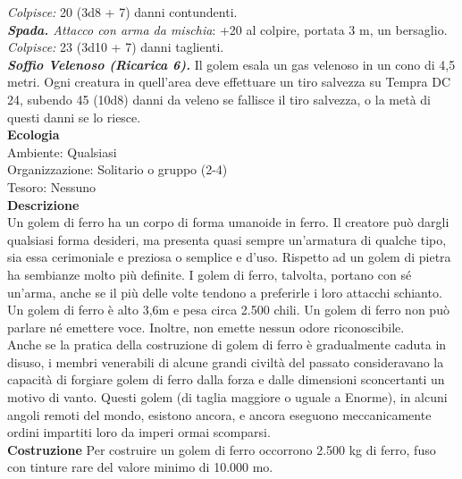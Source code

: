 \begin{multicols}{2}
\emph{Colpisce:} 20 (3d8 + 7) danni contundenti.\\
\emph{\textbf{Spada.} Attacco con arma da mischia}: +20 al colpire, portata 3 m, un bersaglio.\\
\emph{Colpisce:} 23 (3d10 + 7) danni taglienti.\\
\emph{\textbf{Soffio Velenoso (Ricarica 6).}} Il golem esala un gas velenoso in un cono di 4,5 metri. Ogni creatura in quell'area deve effettuare un tiro salvezza su Tempra DC  24, subendo 45 (10d8) danni da veleno se fallisce il tiro salvezza, o la metà di questi danni se lo riesce.\\
\textbf{Ecologia}\\
Ambiente: Qualsiasi\\
Organizzazione: Solitario o gruppo (2-4)\\
Tesoro: Nessuno\\
\textbf{Descrizione}\\
Un golem di ferro ha un corpo di forma umanoide in ferro. Il creatore può dargli qualsiasi forma desideri, ma presenta quasi sempre un'armatura di qualche tipo, sia essa cerimoniale e preziosa o semplice e d'uso. Rispetto ad un golem di pietra ha sembianze molto più definite. I golem di ferro, talvolta, portano con sé un'arma, anche se il più delle volte tendono a preferirle i loro attacchi schianto.\\

Un golem di ferro è alto 3,6m e pesa circa 2.500 chili. Un golem di ferro non può parlare né emettere voce. Inoltre, non emette nessun odore riconoscibile.\\

Anche se la pratica della costruzione di golem di ferro è gradualmente caduta in disuso, i membri venerabili di alcune grandi civiltà del passato consideravano la capacità di forgiare golem di ferro dalla forza e dalle dimensioni sconcertanti un motivo di vanto. Questi golem (di taglia maggiore o uguale a Enorme), in alcuni angoli remoti del mondo, esistono ancora, e ancora eseguono meccanicamente ordini impartiti loro da imperi ormai scomparsi.\\

\textbf{Costruzione}
Per costruire un golem di ferro occorrono 2.500 kg di ferro, fuso con tinture rare del valore minimo di 10.000 mo.\\


\end{multicols}
